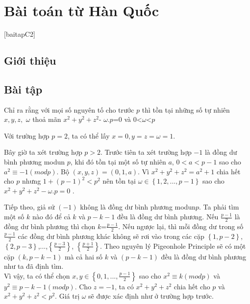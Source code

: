 
\chapter{Bài toán từ  Hàn Quốc}%
\minitoc %
\thispagestyle{empty}
[baitapC2]
\vspace*{1cm}

\section{Giới thiệu}




\section{Bài tập}



\begin{baitap}
Chỉ ra rằng với mọi số nguyên tố cho trước $p$  thì tồn tại những số tự nhiên $x,y,z,$ $\omega$ 
thoả mãn $x^{2}+y^{2}+z^{2}$- $\omega$.$p$=$0$ và $0$<$\omega$<$p$

\begin{loigiai2}
Với trường hợp $p=2$, ta có thể lấy $x=0, y=z=\omega=1$.

Bây giờ ta xét trường hợp $p>2$. Trước tiên ta xét trường hợp $-1$ là đồng dư bình phương modun  $p$, 
khi đó tồn tại một số tự nhiên $a$, $0<a<p-1$ sao cho $a^{2}\equiv-1(modp)$. 
Bộ $(x,y,z)=(0,1,a)$. Vì $x^{2}+y^{2}+z^{2}=a^{2}+1$  chia hết cho  $p$  nhưng $1+(p-1)^{2}<p^2$  
nên tồn tại $\omega\in\left\{1,2,...,p-1\right\} $ sao cho  $x^{2}+y^{2}+z^{2}- \omega.p=0$ .

Tiếp theo, giả sử $(-1)$  không là đồng dư bình phương modun$p$. Ta phải tìm một số $k$ nào đó để cả $k$ và
 $p-k-1$ đều là đồng dư bình phương. Nếu $\frac{p-1}{2}$ là đồng dư bình phương thì chọn $k$=$\frac{p-1}{2}$. 
Nếu ngược lại, thì mỗi đồng dư trong số $\frac{p-1}{2}$ các đồng dư bình phương khác không sẽ rơi vào trong 
các cặp $\left\{1, p-2\right\}$, $\left\{2, p-3\right\}$,...,$\left\{\frac{p-3}{2}\right\}$, $\left\{\frac{p+1}{2}\right\}$. 
Theo nguyên lý Pigeonhole Principle sẽ có một cặp $(k, p-k-1)$ mà cả hai số $k$ và $(p-k-1)$ đều là đồng dư bình 
phương như ta đã định tìm.\\
Vì vậy, ta có thể chọn $x, y\in\left\{0, 1,..., \frac{p-1}{2}\right\}$ sao cho $x^{2}\equiv k (modp)$ 
và  $y^{2}\equiv p-k-1(modp)$. Cho $z=-1$, ta có $x^2+y^2+z^2$ chia hết cho $p$ và  $x^2+y^2+z^2 <p^2$. 
Giá trị  $\omega$ sẽ được xác định như ở trường hợp trước.
\end{loigiai2}
\end{baitap}

